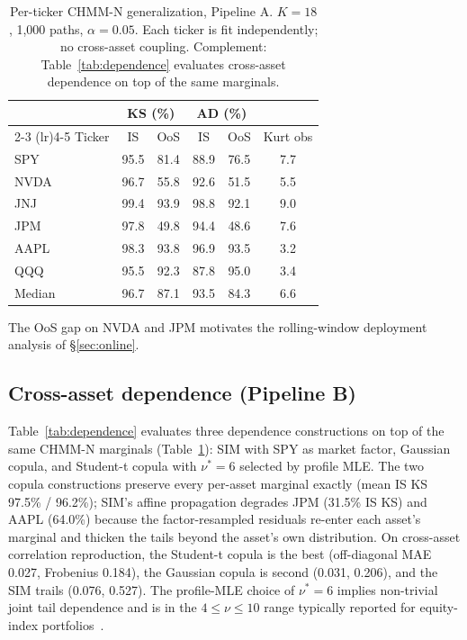 \documentclass[sigconf,anonymous,nonacm=true]{acmart}
\begin{document}
\begin{table}[t]
\centering
\small
\caption{Per-ticker CHMM-N generalization, Pipeline A. $K = 18$,
1{,}000 paths, $\alpha = 0.05$. Each ticker is fit independently; no
cross-asset coupling. Complement: Table~\ref{tab:dependence} evaluates
cross-asset dependence on top of the same marginals.}
\label{tab:six_ticker}
\begin{tabular}{l cc cc c}
\toprule
 & \multicolumn{2}{c}{KS (\%)} & \multicolumn{2}{c}{AD (\%)} & \\
\cmidrule(lr){2-3} \cmidrule(lr){4-5}
Ticker & IS & OoS & IS & OoS & Kurt obs \\
\midrule
SPY    & 95.5 & 81.4 & 88.9 & 76.5 & 7.7 \\
NVDA   & 96.7 & 55.8 & 92.6 & 51.5 & 5.5 \\
JNJ    & 99.4 & 93.9 & 98.8 & 92.1 & 9.0 \\
JPM    & 97.8 & 49.8 & 94.4 & 48.6 & 7.6 \\
AAPL   & 98.3 & 93.8 & 96.9 & 93.5 & 3.2 \\
QQQ    & 95.5 & 92.3 & 87.8 & 95.0 & 3.4 \\
\midrule
Median & 96.7 & 87.1 & 93.5 & 84.3 & 6.6 \\
\bottomrule
\end{tabular}
\end{table}

The OoS gap on NVDA and JPM motivates the rolling-window deployment
analysis of \S\ref{sec:online}.

\subsection{Cross-asset dependence (Pipeline B)}

Table~\ref{tab:dependence} evaluates three dependence constructions on
top of the same CHMM-N marginals (Table~\ref{tab:six_ticker}): SIM with
SPY as market factor, Gaussian copula, and Student-t copula with
$\nu^* = 6$ selected by profile MLE. The two copula constructions
preserve every per-asset marginal exactly (mean IS KS
97.5\% / 96.2\%); SIM's affine propagation degrades JPM (31.5\% IS KS)
and AAPL (64.0\%) because the factor-resampled residuals re-enter each
asset's marginal and thicken the tails beyond the asset's own
distribution. On cross-asset correlation reproduction, the Student-t
copula is the best (off-diagonal MAE 0.027, Frobenius 0.184), the
Gaussian copula is second (0.031, 0.206), and the SIM trails (0.076,
0.527). The profile-MLE choice of $\nu^* = 6$ implies non-trivial joint
tail dependence and is in the $4 \leq \nu \leq 10$ range typically
reported for equity-index portfolios~\cite{demarta2005tcopula,
mcneil2015quantitative}.
\end{document}
